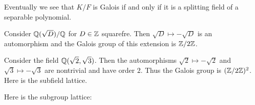 \documentclass[10pt, twoside]{article}
\begin{document}
    Eventually we see that $K/F$ is Galois if and only if it is a splitting
    field of a separable polynomial.

    \begin{exm} Consider $\mathbb{Q}(\sqrt{D})/\mathbb{Q}$ for $D \in \mathbb{Z}$ squarefre. Then
    $\sqrt{D} \mapsto - \sqrt{D}$ is an automorphism and the Galois group of
this extension is $\mathbb{Z}/2\mathbb{Z}$.  \end{exm}

    \begin{exm} Consider the field $\mathbb{Q}(\sqrt{2}, \sqrt{3})$. Then the
        automorphisms $\sqrt{2} \mapsto -\sqrt{2}$ and $\sqrt{3} \mapsto
        -\sqrt{3}$ are nontrivial and have order $2$. Thus the Galois group is
        $(\mathbb{Z}/2\mathbb{Z})^2$. Here is the subfield lattice.  \begin{center}
                                    \end{center} Here is the subgroup lattice:
                                    \begin{center} 
\end{center}
\end{exm}
\end{document}
